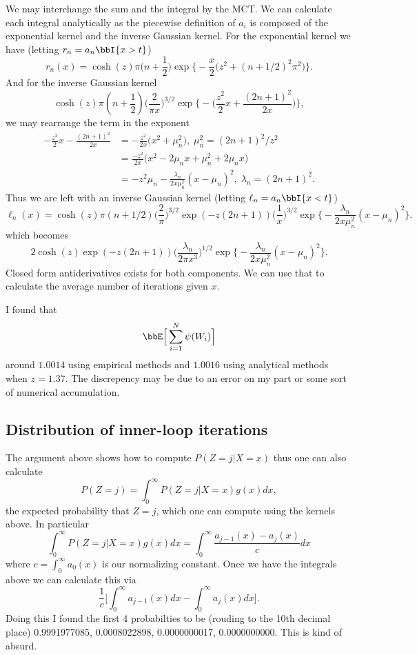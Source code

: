 \documentclass[]{article}
\begin{document}
We may interchange the sum and the integral by the MCT.  We can calculate each
integral analytically as the piecewise definition of $a_i$ is composed of the
exponential kernel and the inverse Gaussian kernel.  For the exponential kernel
we have (letting $r_n = a_n \bbI \{x > t\}$)
\[
r_n(x) = \cosh(z) \pi \Big(n + \frac{1}{2}\Big) 
\exp \Big\{ -\frac{x}{2} \Big( z^2 + (n+1/2)^2 \pi^2 \Big) \Big\}.
\]
And for the inverse Gaussian kernel
\[
\cosh(z)
\pi (n+\frac{1}{2}) \Big(\frac{2}{\pi x}\Big)^{3/2}
  \exp \Big\{ - \Big( \frac{z^2}{2} x + \frac{(2n+1)^2}{2x} \Big) \Big\},
\]
we may rearrange the term in the exponent
\begin{align*}
- \frac{z^2}{2}x - \frac{(2n + 1)^2}{2x}
& = -\frac{z^2}{2x} \Big( x^2 + \mu_n^2 \Big), \; \mu_n^2 = (2n+1)^2 / z^2
\\
& = \frac{-z^2}{2x} \Big( x^2 - 2 \mu_n x + \mu_n^2 + 2 \mu_n x \Big) \\
& = -z^2 \mu_n - \frac{\lambda_n}{2x \mu_n^2} (x - \mu_n)^2, \; \lambda_n =
(2n+1)^2.
\end{align*}
Thus we are left with an inverse Gaussian kernel (letting $\ell_n = a_n \bbI \{x
< t\}$)
\[
\ell_n(x) = 
\cosh(z) \pi (n + 1/2) \Big(\frac{2}{\pi}\Big)^{3/2} \exp(-z (2n+1))
\Big(\frac{1}{x}\Big)^{3/2}
\exp \Big\{ -\frac{\lambda_n}{2x\mu_n^2}(x-\mu_n)^2 \Big\}.
\]
which becomes
\[
2 \cosh(z) \exp(-z(2n+1))
\Big(\frac{\lambda_n}{2 \pi x^3}\Big)^{1/2} 
\exp \Big\{ -\frac{\lambda_n}{2x\mu_n^2}(x-\mu_n)^2 \Big\}.
\]
Closed form antiderivatives exists for both components.  We can use that to
calculate the average number of iterations given $x$.

I found that 
\[
\bbE \Big[\sum_{i=1}^N \psi(W_i) \Big]
\]
around $1.0014$ using empirical methods and $1.0016$ using analytical methods
when $z = 1.37$.  The discrepency may be due to an error on my part or some sort
of numerical accumulation.

\subsection{Distribution of inner-loop iterations}

The argument above shows how to compute $P(Z = j | X = x)$ thus one can also
calculate
\[
P(Z = j) = \int_{0}^\infty P(Z = j | X = x) g(x) dx,
\]
the expected probability that $Z = j$, which one can compute using the kernels
above.  In particular
\[
\int_{0}^\infty P(Z = j | X = x) g(x) dx = \int_0^\infty \frac{a_{j-1}(x) -
  a_j(x)}{c} dx
\]
where $c = \int_0^\infty a_0(x)$ is our normalizing constant.  Once we have the
integrals above we can calculate this via
\[
\frac{1}{c} \Big[ \int_0^\infty a_{j-1}(x) dx - \int_0^\infty  a_j(x) dx \Big].
\]
Doing this I found the first 4 probabilties to be (rouding to the 10th decimal
place) 0.9991977085, 0.0008022898, 0.0000000017, 0.0000000000.  This is kind
of absurd.
\end{document}
